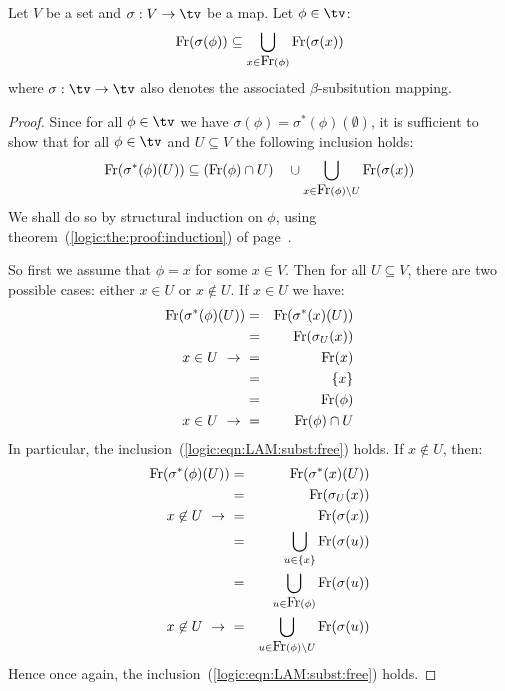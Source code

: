 \begin{prop}\label{logic:prop:LAM:subst:free}
Let $V$ be a set and $\sigma:V\to\tv$ be a map. Let $\phi\in\tv$:
    \[
    \mbox{\rm Fr}(\sigma(\phi))\subseteq\bigcup_{x\in\mbox{\rm Fr}(\phi)} \mbox{\rm Fr}(\sigma(x))
    \]
where $\sigma:\tv\to\tv$ also denotes the associated $\beta$-subsitution mapping.
\end{prop}
\begin{proof}
Since for all $\phi\in\tv$ we have $\sigma(\phi)=\sigma^{*}(\phi)(\emptyset)$, 
it is sufficient to show that for all $\phi\in\tv$ and $U\subseteq V$ the following
inclusion holds:
    \begin{equation}\label{logic:eqn:LAM:subst:free}
        \free(\sigma^{*}(\phi)(U)) \subseteq (\free(\phi)\cap U)\ \ \ \cup
        \bigcup_{x\in\free(\phi)\setminus U} \free(\sigma(x))
    \end{equation}
We shall do so by structural induction on $\phi$, using
theorem~(\ref{logic:the:proof:induction}) of 
page~\pageref{logic:the:proof:induction}.

So first we assume that $\phi=x$ for some $x\in V$. Then for all $U\subseteq V$, there are
two possible cases: either $x\in U$ or $x\not\in U$. If $x\in U$ we have:
    \begin{eqnarray*}
        \mbox{\rm Fr}(\sigma^{*}(\phi)(U))
        &=&\mbox{\rm Fr}(\sigma^{*}(x)(U))\\
        &=&\mbox{\rm Fr}(\sigma_{U}(x))\\
        \mbox{$x\in U\ \rightarrow\ $}&=&\mbox{\rm Fr}(x)\\
         &=&\{x\}\\
         &=&\mbox{\rm Fr}(\phi)\\
        \mbox{$x\in U\ \rightarrow\ $}&=&\mbox{\rm Fr}(\phi)\cap U
    \end{eqnarray*}
In particular, the inclusion~(\ref{logic:eqn:LAM:subst:free}) holds. If $x\not\in U$, then:
    \begin{eqnarray*}
        \free(\sigma^{*}(\phi)(U))
        &=&\free(\sigma^{*}(x)(U))\\
        &=&\free(\sigma_{U}(x))\\
        \mbox{$x\not\in U\ \rightarrow\ $}&=&\free(\sigma(x))\\
        &=&\bigcup_{u\in\{x\}} \free(\sigma(u))\\
        &=&\bigcup_{u\in\free(\phi)} \free(\sigma(u))\\
        \mbox{$x\not\in U\ \rightarrow\ $}&=&\bigcup_{u\in\free(\phi)\setminus U} 
            \free(\sigma(u))
    \end{eqnarray*}
Hence once again, the inclusion~(\ref{logic:eqn:LAM:subst:free}) holds.
 

\end{proof}
